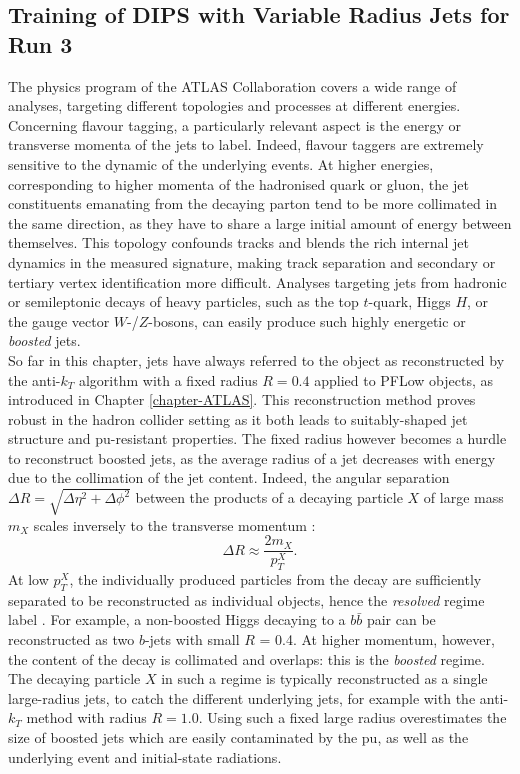 \subsection{Training of DIPS with Variable Radius Jets for Run 3}\label{chapter:dipsVRtrain}
The physics program of the ATLAS Collaboration covers a wide range of analyses, targeting different topologies and processes at different energies. Concerning flavour tagging, a particularly relevant aspect is the energy or transverse momenta of the jets to label. Indeed, flavour taggers are extremely sensitive to the dynamic of the underlying events. At higher energies, corresponding to higher momenta of the hadronised quark or gluon, the jet constituents emanating from the decaying parton tend to be more collimated in the same direction, as they have to share a large initial amount of energy between themselves. This topology confounds tracks and blends the rich internal jet dynamics in the measured signature, making track separation and secondary or tertiary vertex identification more difficult. Analyses targeting jets from hadronic or semileptonic decays of heavy particles, such as the top $t$-quark, Higgs $H$, or the gauge vector $W$-/$Z$-bosons, can easily produce such highly energetic or \textit{boosted} jets.  \\

So far in this chapter, jets have always referred to the object as reconstructed by the anti-$k_T$ algorithm with a fixed radius $R = 0.4$ applied to PFLow objects, as introduced in Chapter \ref{chapter-ATLAS}. This reconstruction method proves robust in the hadron collider setting as it both leads to suitably-shaped jet structure and \gls{pu}-resistant properties. The fixed radius however becomes a hurdle to reconstruct boosted jets, as the average radius of a jet decreases with energy due to the collimation of the jet content. Indeed, the angular separation $\Delta R = \sqrt{\Delta\eta^2 + \Delta \phi^2}$ between the products of a decaying particle $X$ of large mass $m_X$ scales inversely to the transverse momentum \cite{ATLAS:largeRjet}: 
\begin{equation}\label{eq:sizeJet}
  \Delta R \approx \frac{2 m_X}{p_T^X}.
\end{equation}
At low $p_T^X$, the individually produced particles from the decay are sufficiently separated to be reconstructed as individual objects, hence the \textit{resolved} regime label \cite{ATLAS:2016hcf}. For example, a non-boosted Higgs decaying to a $b\bar{b}$ pair can be reconstructed as two $b$-jets with small $R$ = 0.4. At higher momentum, however, the content of the decay is collimated and overlaps: this is the \textit{boosted} regime. The decaying particle $X$ in such a regime is typically reconstructed as a single large-radius jets, to catch the different underlying jets, for example with the anti-$k_T$ method with radius $R = 1.0$. Using such a fixed large radius overestimates the size of boosted jets which are easily contaminated by the \gls{pu}, as well as the underlying event and initial-state radiations.  \\

